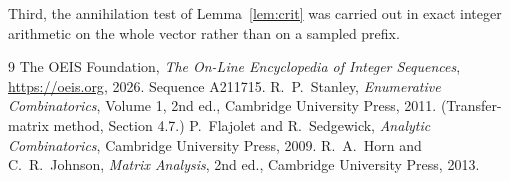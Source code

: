 \documentclass[11pt,a4paper]{article}
\theoremstyle{plain}
\theoremstyle{definition}
\begin{document}
Third, the annihilation test of Lemma~\ref{lem:crit} was carried out in exact integer
arithmetic on the whole vector rather than on a sampled prefix.

\begin{thebibliography}{9}
 The OEIS Foundation, \emph{The On-Line Encyclopedia of Integer
Sequences}, \url{https://oeis.org}, 2026. Sequence A211715.
 R.~P.~Stanley, \emph{Enumerative Combinatorics}, Volume 1, 2nd ed.,
Cambridge University Press, 2011. (Transfer-matrix method, Section 4.7.)
 P.~Flajolet and R.~Sedgewick, \emph{Analytic Combinatorics}, Cambridge
University Press, 2009.
 R.~A.~Horn and C.~R.~Johnson, \emph{Matrix Analysis}, 2nd ed., Cambridge
University Press, 2013.
\end{thebibliography}
\end{document}
